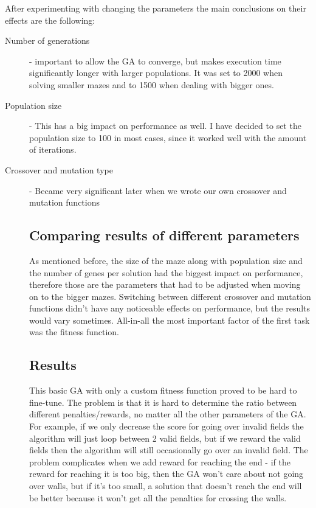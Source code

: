 \documentclass{article}
\begin{document}
After experimenting with changing the parameters the main conclusions on their effects are the following: 
\begin{description}

\item[Number of generations] - important to allow the GA to converge, but makes execution time significantly longer with larger populations. It was set to 2000 when solving smaller mazes and to 1500 when dealing with bigger ones.

\item[Population size] - This has a big impact on performance as well. I have decided to set the population size to 100 in most cases, since it worked well with the amount of iterations.

\item[Crossover and mutation type] - Became very significant later when we wrote our own crossover and mutation functions

\subsection{Comparing results of different parameters}
As mentioned before, the size of the maze along with population size and the number of genes per solution had the biggest impact on performance, therefore those are the parameters that had to be adjusted when moving on to the bigger mazes. Switching between different crossover and mutation functions didn't have any noticeable effects on performance, but the results would vary sometimes. All-in-all the most important factor of the first task was the fitness function. 

\subsection{Results}
This basic GA with only a custom fitness function proved to be hard to fine-tune. The problem is that it is hard to determine the ratio between different penalties/rewards, no matter all the other parameters of the GA. For example, if we only decrease the score for going over invalid fields the algorithm will just loop between 2 valid fields, but if we reward the valid fields then the algorithm will still occasionally go over an invalid field. The problem complicates when we add reward for reaching the end - if the reward for reaching it is too big, then the GA won't care about not going over walls, but if it's too small, a solution that doesn't reach the end will be better because it won't get all the penalties for crossing the walls.


\end{description}
\end{document}
